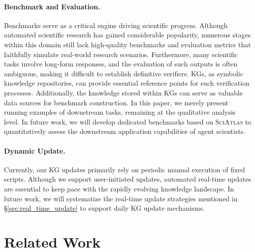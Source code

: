 \documentclass{llmxive}
\providecommand{\ours}{\textsc{SciAtlas}}
\begin{document}
\paragraph{Benchmark and Evaluation.}
Benchmarks serve as a critical engine driving scientific progress.
Although automated scientific research has gained considerable popularity, numerous stages within this domain still lack high-quality benchmarks and evaluation metrics that faithfully simulate real-world research scenarios.
Furthermore, many scientific tasks involve long-form responses, and the evaluation of such outputs is often ambiguous, making it difficult to establish definitive verifiers.
KGs, as symbolic knowledge repositories, can provide essential reference points for such verification processes.
Additionally, the knowledge stored within KGs can serve as valuable data sources for benchmark construction.
In this paper, we merely present running examples of downstream tasks, remaining at the qualitative analysis level.
In future work, we will develop dedicated benchmarks based on {\ours} to quantitatively assess the downstream application capabilities of agent scientists.

\paragraph{Dynamic Update.}
Currently, our KG updates primarily rely on periodic manual execution of fixed scripts.
Although we support user-initiated updates, automated real-time updates are essential to keep pace with the rapidly evolving knowledge landscape.
In future work, we will systematize the real-time update strategies mentioned in \S\ref{sec:real_time_update} to support daily KG update mechanisms.

\section{Related Work}
\end{document}
